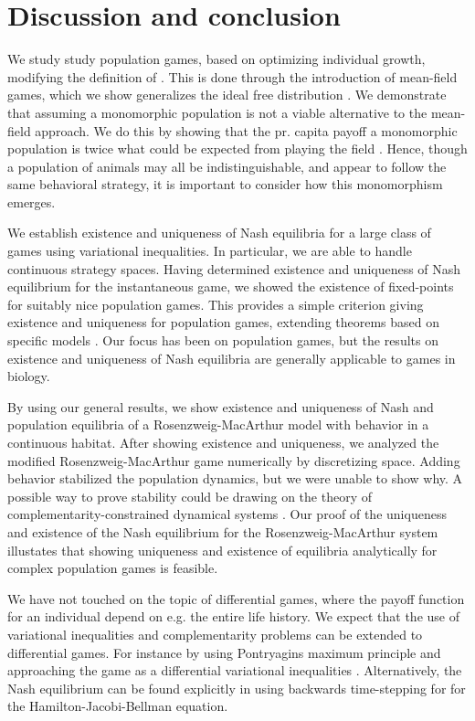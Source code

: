 \section{Discussion and conclusion}
We study study population games, based on optimizing individual growth, modifying the definition of \citep{vincent2005evolutionary}. This is done through the introduction of mean-field games, which we show generalizes the ideal free distribution \citep{fretwell1969territorial}. We demonstrate that assuming a monomorphic population is not a viable alternative to the mean-field approach. We do this by showing that the pr. capita payoff a monomorphic population is twice what could be expected from playing the field  \citep{parker1978searching} . Hence, though a population of animals may all be indistinguishable, and appear to follow the same behavioral strategy, it is important to consider how this monomorphism emerges.


We establish existence and uniqueness of Nash equilibria for a large class of games using variational inequalities. In particular, we are able to handle continuous strategy spaces. Having determined existence and uniqueness of Nash equilibrium for the instantaneous game, we showed the existence of fixed-points for suitably nice population games. This provides a simple criterion giving existence and uniqueness for population games, extending theorems based on specific models \citep{cressman2010ideal,sandholm2010population}. Our focus has been on population games, but the results on existence and uniqueness of Nash equilibria are generally applicable to games in biology.


By using our general results, we show existence and uniqueness of Nash and population equilibria of a Rosenzweig-MacArthur model with behavior in a continuous habitat. After showing existence and uniqueness, we analyzed the modified Rosenzweig-MacArthur game numerically by discretizing space. Adding behavior stabilized the population dynamics, but we were unable to show why. A possible way to prove stability could be drawing on the theory of complementarity-constrained dynamical systems \citep{adly2018variational,brogliato2020dynamical}.
Our proof of the uniqueness and existence of the Nash equilibrium for the Rosenzweig-MacArthur system illustates that showing uniqueness and existence of equilibria analytically for complex population games \cite{pinti2019trophic} is feasible.


We have not touched on the topic of differential games, where the payoff function for an individual depend on e.g. the entire life history. We expect that the use of variational inequalities and complementarity problems can be extended to differential games. For instance by using Pontryagins maximum principle and approaching the game as a differential variational inequalities \citep{pang2008differential}. Alternatively, the Nash equilibrium can be found explicitly in using backwards time-stepping for for the Hamilton-Jacobi-Bellman equation.



